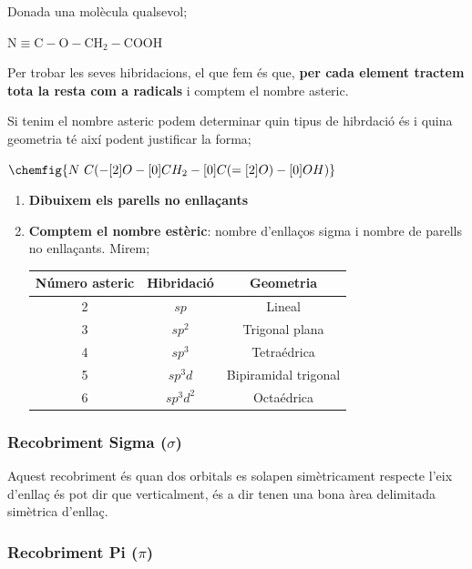 \documentclass[12pt]{article}
\begin{document}
\begin{examplebox}{}
    Donada una molècula qualsevol;

    $\mathrm{N\equiv C-O-CH_2-COOH}$

    Per trobar les seves hibridacions, el que fem és que, \textbf{per cada element tractem tota la resta com a radicals} i comptem el nombre asteric.

    Si tenim el nombre asteric podem determinar quin tipus de hibrdació és i quina geometria té així podent justificar la forma;

    $\chemfig{N~C(-[2]O-[0]CH_2-[0]C(=[2]O)-[0]OH)}$

    \begin{enumerate}
        \item \textbf{Dibuixem els parells no enllaçants}
        \item \textbf{Comptem el nombre estèric}: nombre d'enllaços sigma i nombre de parells no enllaçants.
        Mirem;

        \begin{center}
            \begin{tabular}{c c c}
            \hline
            \textbf{Número asteric} & \textbf{Hibridació} & \textbf{Geometria} \\
            \hline
            2 & $sp$ & Lineal \\
            3 & $sp^2$ & Trigonal plana \\
            4 & $sp^3$ & Tetraédrica \\
            5 & $sp^3d$ & Bipiramidal trigonal \\
            6 & $sp^3d^2$ & Octaédrica \\
            \hline
            \end{tabular}
        \end{center}

    \end{enumerate}
\end{examplebox}

\subsubsection{Recobriment Sigma (\texorpdfstring{$\sigma$}{sigma})}

Aquest recobriment és quan dos orbitals es solapen simètricament respecte l'eix d'enllaç és pot dir que verticalment, és a dir tenen una bona àrea delimitada simètrica d'enllaç.

\subsubsection{Recobriment Pi (\texorpdfstring{$\pi$}{pi})}
\end{document}
